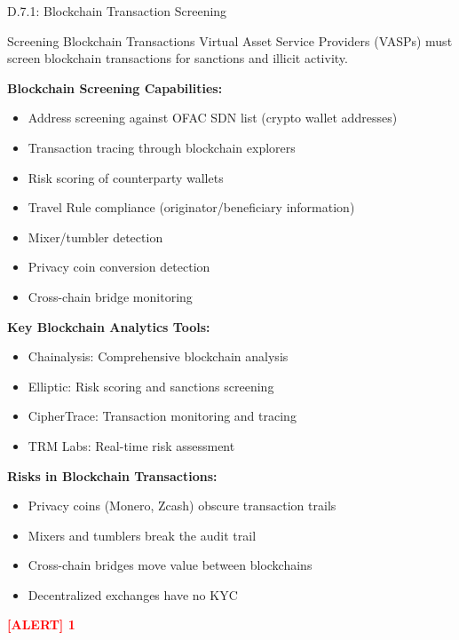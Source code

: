 \documentclass[11pt,a4paper]{beamer}
\newcommand{\redflag}[1]{\textcolor{red}{\textbf{[ALERT] 1}}}
\begin{document}
\begin{frame}{D.7.1: Blockchain Transaction Screening}
	\begin{block}{Screening Blockchain Transactions}
		Virtual Asset Service Providers (VASPs) must screen blockchain transactions for sanctions and illicit activity.
	\end{block}
	\textbf{Blockchain Screening Capabilities:}
	\begin{itemize}
		\item Address screening against OFAC SDN list (crypto wallet addresses)
		\item Transaction tracing through blockchain explorers
		\item Risk scoring of counterparty wallets
		\item Travel Rule compliance (originator/beneficiary information)
		\item Mixer/tumbler detection
		\item Privacy coin conversion detection
		\item Cross-chain bridge monitoring
	\end{itemize}
	\textbf{Key Blockchain Analytics Tools:}
	\begin{itemize}
		\item Chainalysis: Comprehensive blockchain analysis
		\item Elliptic: Risk scoring and sanctions screening
		\item CipherTrace: Transaction monitoring and tracing
		\item TRM Labs: Real-time risk assessment
	\end{itemize}
	\textbf{Risks in Blockchain Transactions:}
	\begin{itemize}
		\item Privacy coins (Monero, Zcash) obscure transaction trails
		\item Mixers and tumblers break the audit trail
		\item Cross-chain bridges move value between blockchains
		\item Decentralized exchanges have no KYC
	\end{itemize}
	\redflag{Transactions involving privacy coins, mixers, or cross-chain bridges require EDD.}
\end{frame}
\end{document}
